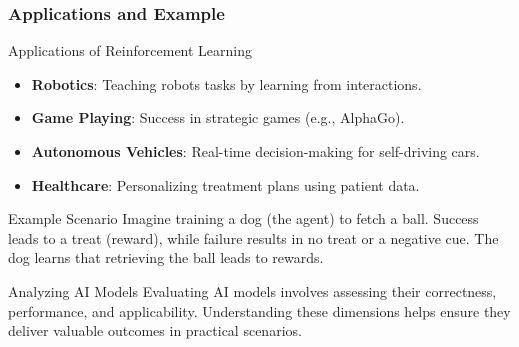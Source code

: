 \documentclass[aspectratio=169]{beamer}
\begin{document}
\begin{frame}[fragile]
    \frametitle{Applications and Example}
    \begin{block}{Applications of Reinforcement Learning}
        \begin{itemize}
            \item \textbf{Robotics}: Teaching robots tasks by learning from interactions.
            \item \textbf{Game Playing}: Success in strategic games (e.g., AlphaGo).
            \item \textbf{Autonomous Vehicles}: Real-time decision-making for self-driving cars.
            \item \textbf{Healthcare}: Personalizing treatment plans using patient data.
        \end{itemize}
    \end{block}
    \begin{block}{Example Scenario}
        Imagine training a dog (the agent) to fetch a ball. Success leads to a treat (reward), while failure results in no treat or a negative cue. The dog learns that retrieving the ball leads to rewards.
    \end{block}
\end{frame}

\begin{frame}[fragile]{Analyzing AI Models}
    Evaluating AI models involves assessing their correctness, performance, and applicability. 
    Understanding these dimensions helps ensure they deliver valuable outcomes in practical scenarios.
\end{frame}
\end{document}
